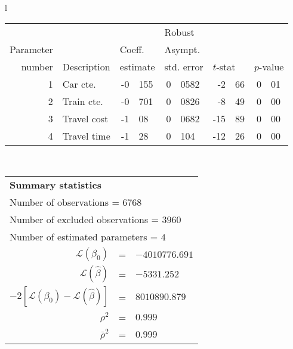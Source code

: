   \begin{tabular}{l}
\begin{tabular}{rlr@{.}lr@{.}lr@{.}lr@{.}l}
         &                       &   \multicolumn{2}{l}{}    & \multicolumn{2}{l}{Robust}  &     \multicolumn{4}{l}{}   \\
Parameter &                       &   \multicolumn{2}{l}{Coeff.}      & \multicolumn{2}{l}{Asympt.}  &     \multicolumn{4}{l}{}   \\
number &  Description                     &   \multicolumn{2}{l}{estimate}      & \multicolumn{2}{l}{std. error}  &   \multicolumn{2}{l}{$t$-stat}  &   \multicolumn{2}{l}{$p$-value}   \\

\hline

1 & Car cte. & -0&155 & 0&0582 & -2&66 & 0&01\\
2 & Train cte. & -0&701 & 0&0826 & -8&49 & 0&00\\
3 & Travel cost & -1&08 & 0&0682 & -15&89 & 0&00\\
4 & Travel time & -1&28 & 0&104 & -12&26 & 0&00\\
\hline
\end{tabular}
\\
\begin{tabular}{rcl}
\multicolumn{3}{l}{\bf Summary statistics}\\
\multicolumn{3}{l}{ Number of observations = $6768$} \\
\multicolumn{3}{l}{ Number of excluded observations = $3960$} \\
\multicolumn{3}{l}{ Number of estimated  parameters = $4$} \\
 $\mathcal{L}(\beta_0)$ &=&  $-4010776.691$ \\
 $\mathcal{L}(\hat{\beta})$ &=& $-5331.252 $  \\
 $-2[\mathcal{L}(\beta_0) -\mathcal{L}(\hat{\beta})]$ &=& $8010890.879$ \\
    $\rho^2$ &=&   $0.999$ \\
    $\bar{\rho}^2$ &=&    $0.999$ \\
\end{tabular}
  \end{tabular}
